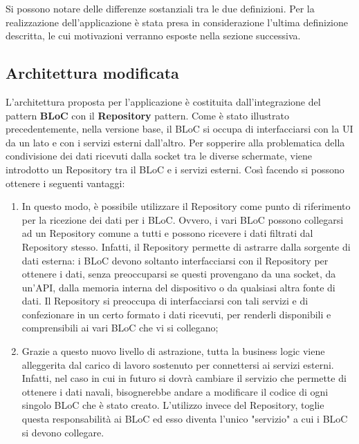 Si possono notare delle differenze sostanziali tra le due definizioni. Per la realizzazione dell'applicazione è stata presa in considerazione l'ultima definizione descritta, le cui motivazioni verranno esposte nella sezione successiva.

\subsection{Architettura modificata}
L'architettura proposta per l'applicazione è costituita dall'integrazione del pattern \textbf{BLoC} con il \textbf{Repository} pattern. Come è stato illustrato precedentemente, nella versione base, il BLoC si occupa di interfacciarsi con la UI da un lato e con i servizi esterni dall'altro. Per sopperire alla problematica della condivisione dei dati ricevuti dalla socket tra le diverse schermate, viene introdotto un Repository tra il BLoC e i servizi esterni. Così facendo si possono ottenere i seguenti vantaggi:
\begin{enumerate}
	\item In questo modo, è possibile utilizzare il Repository come punto di riferimento per la ricezione dei dati per i BLoC. Ovvero, i vari BLoC possono collegarsi ad un Repository comune a tutti e possono ricevere i dati filtrati dal Repository stesso. Infatti, il Repository permette di astrarre dalla sorgente di dati esterna: i BLoC devono soltanto interfacciarsi con il Repository per ottenere i dati, senza preoccuparsi se questi provengano da una socket, da un'API, dalla memoria interna del dispositivo o da qualsiasi altra fonte di dati. Il Repository si preoccupa di interfacciarsi con tali servizi e di confezionare in un certo formato i dati ricevuti, per renderli disponibili e comprensibili ai vari BLoC che vi si collegano;
	\item Grazie a questo nuovo livello di astrazione, tutta la business logic viene alleggerita dal carico di lavoro sostenuto per connettersi ai servizi esterni. Infatti, nel caso in cui in futuro si dovrà cambiare il servizio che permette di ottenere i dati navali, bisognerebbe andare a modificare il codice di ogni singolo BLoC che è stato creato. L'utilizzo invece del Repository, toglie questa responsabilità ai BLoC ed esso diventa l'unico "servizio" a cui i BLoC si devono collegare.
\end{enumerate}

